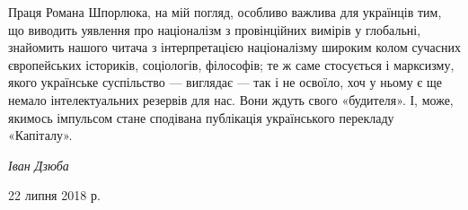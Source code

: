 Праця Романа Шпорлюка, на мій погляд, особливо важлива для українців 
тим, що виводить уявлення про націоналізм з провінційних вимірів у 
глобальні, знайомить нашого читача з інтерпретацією націоналізму 
широким колом сучасних європейських істориків, соціологів, філософів; 
те ж саме стосується і марксизму, якого українське суспільство — 
виглядає — так і не освоїло, хоч у ньому є ще немало інтелектуальних 
резервів для нас. Вони ждуть свого «будителя». І, може, якимось 
імпульсом стане сподівана публікація українського перекладу 
«Капіталу». 

\begin{flushright}
  \emph{Іван Дзюба}
\end{flushright}

{\small 22 липня 2018 р.}
